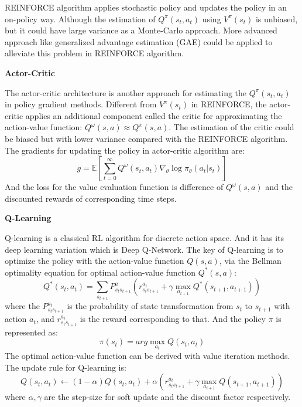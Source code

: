 \documentclass{article}
\begin{document}
REINFORCE algorithm applies stochastic policy and updates the policy in an on-policy way. Although the estimation of $Q^\pi(s_t, a_t)$ using $V^\pi(s_t)$ is unbiased, but it could have large variance as a Monte-Carlo approach. More advanced approach like generalized advantage estimation (GAE) \cite{schulman2015high} could be applied to alleviate this problem in REINFORCE algorithm.

\textbf{Actor-Critic}

The actor-critic architecture is another approach for estimating the $Q^\pi(s_t, a_t)$ in policy gradient methods. Different from $V^\pi(s_t)$ in REINFORCE, the actor-critic applies an additional component called the critic for approximating the action-value function: $Q^\omega(s,a) \approx Q^\pi(s,a)$. The estimation of the critic could be biased but with lower variance compared with the REINFORCE algorithm. The gradients for updating the policy in actor-critic algorithm are:
\begin{equation}
    g=\mathbb{E}[\sum_{t=0}^\infty Q^\omega(s_t,a_t) \nabla_\theta \log \pi_\theta(a_t|s_t)]
\end{equation}
And the loss for the value evaluation function is difference of $Q^\omega(s,a)$ and the discounted rewards of corresponding time steps.

\textbf{Q-Learning}

Q-learning is a classical RL algorithm for discrete action space. And it has its deep learning variation which is Deep Q-Network. The key of Q-learning is to optimize the policy with the action-value function $Q(s,a)$, via the Bellman optimality equation for optimal action-value function $Q^*(s,a)$:
\begin{equation}
    Q^*(s_t,a_t) = \sum_{s_{t+1}}P^a_{s_t s_{t+1}}(r^{a_t}_{s_t s_{t+1}}+\gamma\max_{a_{t+1}} Q^*(s_{t+1},a_{t+1}))
\end{equation}
where the $P^{a_t}_{s_t s_{t+1}}$ is the probability of state transformation from $s_t$ to $s_{t+1}$ with action $a_t$, and $r^{a_t}_{s_t s_{t+1}}$ is the reward corresponding to that.
And the policy $\pi$ is represented as:
\begin{equation}
    \pi(s_t) = arg\max_{a_t} Q(s_t, a_t)
\end{equation}
The optimal action-value function can be derived with value iteration methods. The update rule for Q-learning is:
\begin{equation}
    Q(s_t,a_t) \leftarrow (1-\alpha)Q(s_t, a_t) + \alpha (r^{a_t}_{s_t s_{t+1}}+\gamma\max_{a_{t+1}} Q(s_{t+1},a_{t+1}))
\end{equation}
where $\alpha, \gamma$ are the step-size for soft update and the discount factor respectively.
\end{document}

